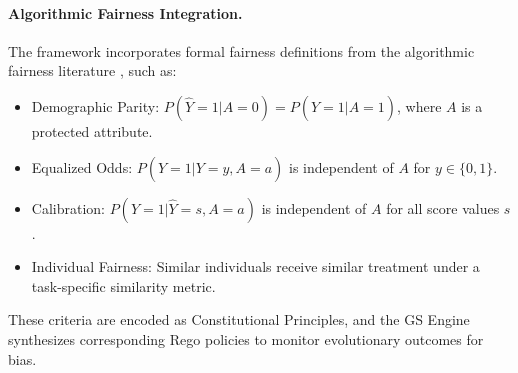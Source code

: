 \documentclass[manuscript,screen,review,anonymous,9pt]{acmart}
\begin{document}
\paragraph{Algorithmic Fairness Integration.} The framework incorporates formal fairness definitions from the algorithmic fairness literature \cite{Barocas2023FairnessML, Hardt2016EqualityOpportunity, Chouldechova2017FairPrediction, Dwork2012DifferentialPrivacy}, such as:
\begin{itemize}[leftmargin=*,itemsep=1pt,parsep=1pt]
    \item Demographic Parity: $P(\hat{Y} = 1 | A = 0) = P(\hat{Y} = 1 | A = 1)$, where $A$ is a protected attribute.
    \item Equalized Odds: $P(\hat{Y} = 1 | Y = y, A = a)$ is independent of $A$ for $y \in \{0,1\}$.
    \item Calibration: $P(Y = 1 | \hat{Y} = s, A = a)$ is independent of $A$ for all score values $s$.
    \item Individual Fairness: Similar individuals receive similar treatment under a task-specific similarity metric.
\end{itemize}
These criteria are encoded as Constitutional Principles, and the GS Engine synthesizes corresponding Rego policies to monitor evolutionary outcomes for bias.
\end{document}
